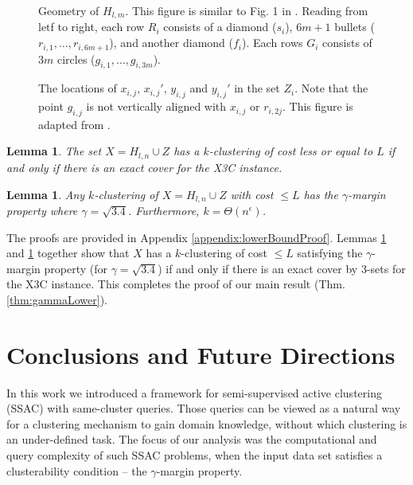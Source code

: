 \documentclass[12pt]{article}
\newtheorem{lemma}[theorem]{Lemma}
\begin{document}
  \begin{figure}[!tbp]
  \centering
  \begin{minipage}[b]{0.49\textwidth}
    \resizebox{\linewidth}{!}{}
    \caption{Geometry of $H_{l,m}$. This figure is similar to Fig. 1 in \cite{vattani2009hardness}.  
    Reading from letf to right, each row $R_i$ consists of a diamond ($s_i$), $6m+1$ bullets ($r_{i,1},\ldots,r_{i,6m+1}$), and another diamond ($f_i$). Each rows $G_i$ consists of $3m$ circles ($g_{i,1}, \ldots, g_{i,3m}$).}
    \label{fig:lowerBoundComponent}
  \end{minipage}
  \hfill
  \begin{minipage}[b]{0.49\textwidth}
    
    \caption{The locations of $x_{i,j}$, $x_{i,j}'$, $y_{i,j}$ and $y_{i,j}'$ in the set $Z_i$. Note that the point $g_{i,j}$ is not vertically aligned with $x_{i, j}$ or $r_{i, 2j}$. This figure is adapted from \cite{vattani2009hardness}.}
    \label{fig:ZFig}
  \end{minipage}
\end{figure}


\begin{lemma}
\label{lemma:kmeansEquivalenceX3C}
The set $X = H_{l,n} \cup Z$ has a $k$-clustering of cost less or equal to $L$ if and only if there is an exact cover for the X3C instance.
\end{lemma}

\begin{lemma}
\label{lemma:gammaLower}
Any $k$-clustering of $X = H_{l,n} \cup Z$ with cost $\le L$ has the $\gamma$-margin property where $\gamma = \sqrt{3.4}$. Furthermore, $k = \Theta(n^{\epsilon})$.
\end{lemma}

The proofs are provided in Appendix \ref{appendix:lowerBoundProof}. Lemmas \ref{lemma:kmeansEquivalenceX3C} and \ref{lemma:gammaLower} together show that $X$ has a $k$-clustering of cost $\le L$ satisfying the $\gamma$-margin property (for $\gamma = \sqrt{3.4}$) if and only if there is an exact cover by $3$-sets for the X3C instance. This completes the proof of our main result (Thm. \ref{thm:gammaLower}). 

\section{Conclusions and Future Directions}
In this work we introduced a framework for semi-supervised active clustering (SSAC) with same-cluster queries. Those queries can be viewed as a natural way for a clustering mechanism to gain domain knowledge, without which clustering is an under-defined task. The focus of our analysis was the computational and query complexity of %
such SSAC problems, when the input data set satisfies a clusterability condition -- the $\gamma$-margin property.
\end{document}
